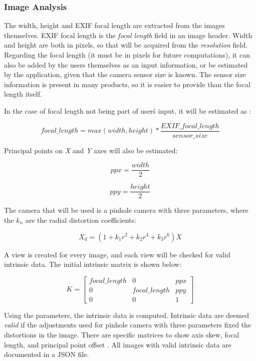 \documentclass[journal]{./IEEE/IEEEtran}
\begin{document}
    \subsubsection{Image Analysis}
    The width, height and EXIF focal length are extracted from the images themselves. EXIF focal length is the \textit{focal length} field in an image header. Width and height are both in pixels, so that will be acquired from the \textit{resolution} field. Regarding the focal length (it must be in pixels for future computations), it can also be added by the users themselves as an input information, or be estimated by the application, given that the camera sensor size is known. The sensor size information is present in many products, so it is easier to provide than the focal length itself.
    
    In the case of focal length not being part of user\'s input, it will be estimated as \cite{Snavely}:
    
    \[focal\_length = max(width, height) * \frac{EXIF\_focal\_length}{sensor\_size}\]
    
    Principal points on \textit{X} and \textit{Y} axes will also be estimated:
    
    \[ppx = \frac{width}{2}\]
    
    \[ppy = \frac{height}{2}\]
    
    The camera that will be used is a pinhole camera with three parameters, where the $k_n$ are the radial distortion coefficients:
    
    \[X_d = (1 + k_1 r^2 + k_2 r^4 + k_3 r^6 ) X\]
    
    A view is created for every image, and each view will be checked for valid intrinsic data. The initial intrinsic matrix is shown below:
    
    \[K = 
        \begin{bmatrix}
            focal\_length & 0 & ppx \\
            0 & focal\_length & ppy \\
            0 & 0 & 1
        \end{bmatrix}
    \]
    
    Using the parameters, the intrinsic data is computed. Intrinsic data are deemed \textit{valid} if the adjustments used for pinhole camera with three parameters fixed the distortions in the image. There are specific matrices to show axis skew, focal length, and principal point offset \cite{Simek}. All images with valid intrinsic data are documented in a JSON file.
    
\end{document}
